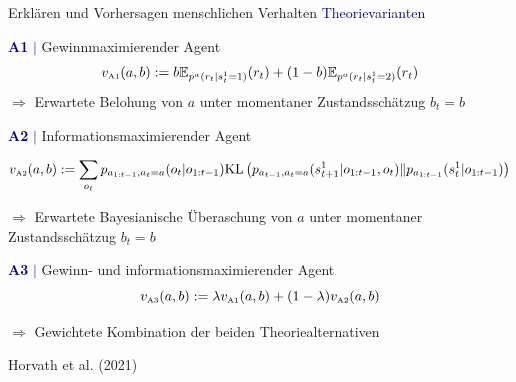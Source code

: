 \documentclass[
  8pt,
  ignorenonframetext,
]{beamer}
\begin{document}
\begin{frame}{Erklären und Vorhersagen menschlichen Verhalten}
\protect\hypertarget{erkluxe4ren-und-vorhersagen-menschlichen-verhalten-3}{}
\textcolor{darkblue}{Theorievarianten}

\small

\textcolor{darkblue}{\textbf{A1}  $\vert$} Gewinnmaximierender Agent
\begin{equation*}
v_{\mbox{\tiny A1}}(a,b)
:=     b\mathbb{E}_{p^{a}(r_t|s_t^1 = 1)}(r_t)
 + (1-b)\mathbb{E}_{p^{a}(r_t|s_t^1 = 2)}(r_t)
\end{equation*} \(\Rightarrow\) Erwartete Belohung von \(a\) unter
momentaner Zustandsschätzug \(b_t = b\)

\textcolor{darkblue}{\textbf{A2} $\vert$} Informationsmaximierender
Agent

\begin{small}
\begin{equation*}
v_{\mbox{\tiny A2}}(a,b)
:=
\sum_{o_t} p_{a_{1:t-1},a_t = a} (o_t|o_{1:t-1})
\mbox{KL}\left(p_{a_{t-1},a_t = a}(s_{t+1}^1|o_{1:t-1},o_t) \Vert p_{a_{1:t-1}}(s_t^1|o_{1:t-1}) \right)
\end{equation*}
\end{small}

\(\Rightarrow\) Erwartete Bayesianische Überaschung von \(a\) unter
momentaner Zustandsschätzug \(b_t = b\)

\textcolor{darkblue}{\textbf{A3} $\vert$} Gewinn- und
informationsmaximierender Agent \begin{equation*}
v_{\mbox{\tiny A3}}(a,b)
:= \lambda v_{\mbox{\tiny A1}}(a,b) +  (1-\lambda) v_{\mbox{\tiny A2}}(a,b)
\end{equation*}

\(\Rightarrow\) Gewichtete Kombination der beiden Theoriealternativen

\flushright
\footnotesize

Horvath et al. (2021)
\end{frame}
\end{document}
